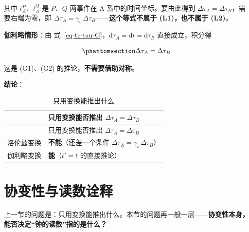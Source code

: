 \documentclass[
  chinese,
  a4paper,
  UTF8,
  12pt,
  oneside,
  openany]{ctexbook}
\theoremstyle{plain}
\theoremstyle{plain}
\theoremstyle{plain}
\theoremstyle{definition}
\theoremstyle{plain}
\theoremstyle{plain}
\theoremstyle{remark}
\begin{document}
其中 \(t_A^{P}\)、\(t_A^{Q}\) 是 \(P\)、\(Q\) 两事件在 A
系中的时间坐标。要由此得到
\(\Delta\tau_A=\Delta\tau_B\)，需要右端为零，即
\(\Delta\tau_A=\gamma_w\Delta\tau_B\)------\textbf{这个等式不属于
(L1)，也不属于 (L2)}。

\textbf{伽利略情形}：由
式~\ref{eq-tc-tau-G}，\(\mathrm{d}\tau_A=\mathrm{d}t=\mathrm{d}\tau_B\)
直接成立，积分得

\begin{equation}\protect\phantomsection\label{eq-tc-equal-G}{
\Delta\tau_A=\Delta\tau_B
}\end{equation}

这是 (G1)、(G2) 的推论，\textbf{不需要借助对称}。

\textbf{结论}：

\begin{longtable}[]{@{}
  >{\raggedright\arraybackslash}p{}
  >{\raggedright\arraybackslash}p{}@{}}
\caption{只用变换能推出什么}\label{tbl-tc-only}\tabularnewline
\toprule\noalign{}
\begin{minipage}[b]{\linewidth}\raggedright
\end{minipage} & \begin{minipage}[b]{\linewidth}\raggedright
只用变换能否推出 \(\Delta\tau_A=\Delta\tau_B\)
\end{minipage} \\
\midrule\noalign{}
\endfirsthead
\toprule\noalign{}
\begin{minipage}[b]{\linewidth}\raggedright
\end{minipage} & \begin{minipage}[b]{\linewidth}\raggedright
只用变换能否推出 \(\Delta\tau_A=\Delta\tau_B\)
\end{minipage} \\
\midrule\noalign{}
\endhead
\bottomrule\noalign{}
\endlastfoot
洛伦兹变换 & \textbf{不能}（还差一个条件
\(\Delta\tau_A=\gamma_w\Delta\tau_B\)） \\
伽利略变换 & \textbf{能}（\(t'=t\) 的直接推论） \\
\end{longtable}

\section{协变性与读数诠释}\label{sec-tc-covariance}

上一节的问题是：只用变换能推出什么。本节的问题再一般一层------\textbf{协变性本身，能否决定``钟的读数''指的是什么？}
\end{document}
